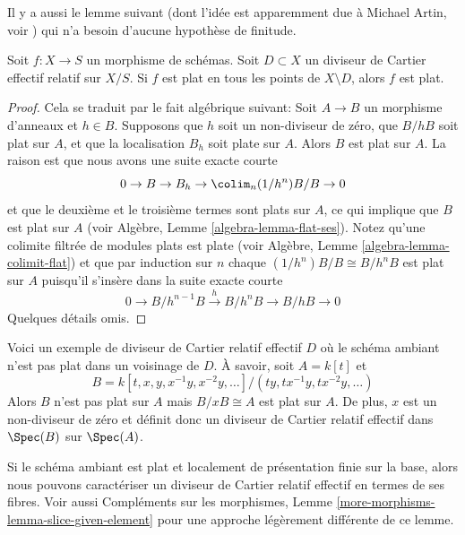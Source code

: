 \noindent
Il y a aussi le lemme suivant (dont l'idée est apparemment due à Michael Artin,
voir  \cite{Nobile}) qui n'a besoin d'aucune hypothèse de finitude.

\begin{lemma}
\label{lemma-michael-artin}
Soit  $f : X \to S$  un morphisme de schémas. Soit  $D \subset X$  un diviseur de
Cartier effectif relatif sur  $X/S$. Si  $f$  est plat en tous les
points de  $X \setminus D$, alors  $f$  est plat.
\end{lemma}

\begin{proof}
Cela se traduit par le fait algébrique suivant: Soit  $A \to B$  un morphisme
d’anneaux et  $h \in B$. Supposons que  $h$  soit un non-diviseur de
zéro, que  $B/hB$  soit plat sur  $A$, et que la localisation
 $B_h$  soit plate sur  $A$. Alors  $B$  est plat sur
 $A$. La raison est que nous avons une suite exacte courte
$$
0 \to B \to B_h \to \colim_n (1/h^n)B/B \to 0
$$
et que le deuxième et le troisième termes sont plats sur  $A$, ce qui
implique que  $B$  est plat sur  $A$  (voir Algèbre, Lemme
 \ref{algebra-lemma-flat-ses}). Notez qu'une colimite filtrée de modules plats est plate (voir
Algèbre, Lemme  \ref{algebra-lemma-colimit-flat}) et que par induction sur  $n$  chaque
 $(1/h^n)B/B \cong B/h^nB$  est plat sur  $A$  puisqu'il s'insère dans la suite exacte
courte
$$
0 \to B/h^{n - 1}B \xrightarrow{h} B/h^nB \to B/hB \to 0
$$
Quelques détails omis.
\end{proof}

\begin{example}
\label{example-relative-cartier-ambient-space-not-flat}
Voici un exemple de diviseur de Cartier relatif effectif  $D$  où le schéma
ambiant n'est pas plat dans un voisinage de  $D$. À savoir, soit
 $A = k[t]$  et
$$
B = k[t, x, y, x^{-1}y, x^{-2}y, \ldots]/(ty, tx^{-1}y, tx^{-2}y, \ldots)
$$
Alors  $B$  n'est pas plat sur  $A$  mais  $B/xB \cong A$  est plat sur
 $A$. De plus,  $x$  est un non-diviseur de zéro et définit donc un
diviseur de Cartier relatif effectif dans  $\Spec(B)$  sur  $\Spec(A)$.
\end{example}

\noindent
Si le schéma ambiant est plat et localement de présentation finie sur la base,
alors nous pouvons caractériser un diviseur de Cartier relatif effectif en termes
de ses fibres. Voir aussi Compléments sur les morphismes, Lemme  \ref{more-morphisms-lemma-slice-given-element}  pour une approche
légèrement différente de ce lemme.

